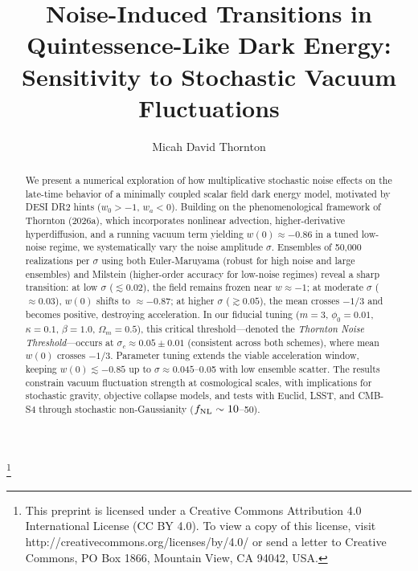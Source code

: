 \documentclass[preprint]{aastex7}
\begin{document}
\title{Noise-Induced Transitions in Quintessence-Like Dark Energy: Sensitivity to Stochastic Vacuum Fluctuations}

\author[0009-0001-9080-8200]{Micah David Thornton}
\footnote{This preprint is licensed under a Creative Commons Attribution 4.0 International License (CC BY 4.0). To view a copy of this license, visit http://creativecommons.org/licenses/by/4.0/ or send a letter to Creative Commons, PO Box 1866, Mountain View, CA 94042, USA.}

\begin{abstract}
We present a numerical exploration of how multiplicative stochastic noise effects on the late-time behavior of a minimally coupled scalar field dark energy model, motivated by DESI DR2 hints (\( w_0 > -1 \), \( w_a < 0 \)). Building on the phenomenological framework of Thornton (2026a), which incorporates nonlinear advection, higher-derivative hyperdiffusion, and a running vacuum term yielding \( w(0) \approx -0.86 \) in a tuned low-noise regime, we systematically vary the noise amplitude \( \sigma \). Ensembles of 50,000 realizations per \( \sigma \) using both Euler-Maruyama (robust for high noise and large ensembles) and Milstein (higher-order accuracy for low-noise regimes) reveal a sharp transition: at low \( \sigma \) (\( \lesssim 0.02 \)), the field remains frozen near \( w \approx -1 \); at moderate \( \sigma \) (\( \approx 0.03 \)), \( w(0) \) shifts to \( \approx -0.87 \); at higher \( \sigma \) (\( \gtrsim 0.05 \)), the mean crosses \( -1/3 \) and becomes positive, destroying acceleration. In our fiducial tuning (\( m=3 \), \( \phi_0=0.01 \), \( \kappa=0.1 \), \( \beta=1.0 \), \( \Omega_m=0.5 \)), this critical threshold—denoted the \textit{Thornton Noise Threshold}—occurs at \( \sigma_c \approx 0.05 \pm 0.01 \) (consistent across both schemes), where mean \( w(0) \) crosses \( -1/3 \). Parameter tuning extends the viable acceleration window, keeping \( w(0) \lesssim -0.85 \) up to \( \sigma \approx 0.045 \)--0.05 with low ensemble scatter. The results constrain vacuum fluctuation strength at cosmological scales, with implications for stochastic gravity, objective collapse models, and tests with Euclid, LSST, and CMB-S4 through stochastic non-Gaussianity (\( f_{\rm NL} \sim 10 \)--50).
\end{abstract}

\end{document}
